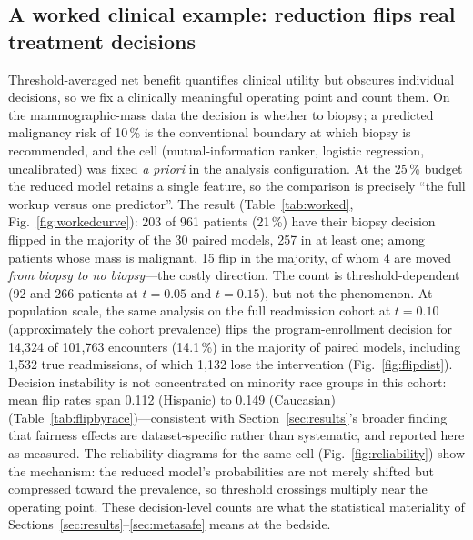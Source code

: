 \documentclass[fleqn,10pt]{wlscirep}
\newcommand{\result}[1]{#1}
\begin{document}
\begin{table}[t]
\centering
\caption{Subsample-agreement check on Diabetes-130: the reduction penalty at 25\,\% of features under
the full cohort versus the corrected $n{=}6{,}000$ robustness arm, per ranker, learner, and outcome,
with confidence-interval overlap and sign/verdict agreement. Computed from the released full-cohort
and robustness-arm summaries.}
\label{tab:fullcohort}

\end{table}

\subsection{A worked clinical example: reduction flips real treatment decisions}
\label{sec:worked}
Threshold-averaged net benefit quantifies clinical utility but obscures individual decisions, so we
fix a clinically meaningful operating point and count them. On the mammographic-mass data the decision
is whether to biopsy; a predicted malignancy risk of \result{10\,\%} is the conventional boundary at
which biopsy is recommended, and the cell (mutual-information ranker, logistic regression,
uncalibrated) was fixed \emph{a priori} in the analysis configuration. At the 25\,\% budget the
reduced model retains a single feature, so the comparison is precisely ``the full workup versus one
predictor''. The result (Table~\ref{tab:worked}, Fig.~\ref{fig:workedcurve}): \result{203} of
\result{961} patients (\result{21\,\%}) have their biopsy decision flipped in the majority of the 30
paired models, \result{257} in at least one; among patients whose mass is malignant, \result{15} flip
in the majority, of whom \result{4} are moved \emph{from biopsy to no biopsy}---the costly direction.
The count is threshold-dependent (\result{92} and \result{266} patients at $t=\result{0.05}$ and
$t=\result{0.15}$), but not the phenomenon. At population scale, the same analysis on the full
readmission cohort at $t=\result{0.10}$ (approximately the cohort prevalence) flips the
program-enrollment decision for \result{14{,}324} of \result{101{,}763} encounters
(\result{14.1\,\%}) in the majority of paired models, including \result{1{,}532} true readmissions,
of which \result{1{,}132} lose the intervention (Fig.~\ref{fig:flipdist}). Decision instability is
not concentrated on minority race groups in this cohort: mean flip rates span \result{0.112}
(Hispanic) to \result{0.149} (Caucasian) (Table~\ref{tab:flipbyrace})---consistent with
Section~\ref{sec:results}'s broader finding that fairness effects are dataset-specific rather than
systematic, and reported here as measured. The reliability diagrams for the same cell
(Fig.~\ref{fig:reliability}) show the mechanism: the reduced model's probabilities are not merely
shifted but compressed toward the prevalence, so threshold crossings multiply near the operating
point. These decision-level counts are what the statistical materiality of
Sections~\ref{sec:results}--\ref{sec:metasafe} means at the bedside.
\end{document}
